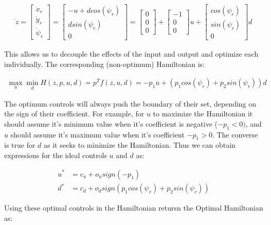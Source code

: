 \documentclass[a4paper]{article}
\begin{document}
\begin{align*}
  \dot{z}
  =
  \left[\begin{matrix} \dot{x}_r \\ \dot{y}_r \\ \dot{\psi}_r \end{matrix}\right]
  =
  \left[\begin{matrix} -u + d cos(\psi_r) \\ d sin(\psi_r) \\ 0 \end{matrix}\right]
  =
  \left[ \begin{matrix} 0 \\ 0 \\ 0 \end{matrix}\right] + \left[ \begin{matrix}-1 \\ 0 \\ 0\end{matrix}\right] u +\left[\begin{matrix} cos(\psi_r) \\ sin(\psi_r) \\ 0 \end{matrix}\right] d
\end{align*}

This allows us to decouple the effects of the input and output and optimize each individually.
   The corresponding (non-optimum) Hamiltonian is:

\begin{align*}
  \underset{u}{\max} \underset{d}{\min} H(z,p,u,d) =  p^T f(z,u,d) = -p_1 u + (p_1 cos(\psi_r) + p_2 sin(\psi_r)) d
\end{align*}

The optimum controls will always push the boundary of their set, depending on the sign of their coefficient.
For example, for $u$ to maximize the Hamiltonian it should assume it's minimum value when it's coefficient is negative ($-p_1 < 0)$, and $u$ should assume it's maximum value when it's coefficient $-p_1 > 0$.
The converse is true for $d$ as it seeks to minimize the Hamiltonian.
Thus we can obtain expressions for the ideal controls $u$ and $d$ as:

\begin{align*}
  u^* &= c_u + o_u sign(-p_1) \\
  d^* &= c_d + o_d sign(p_1 cos(\psi_r) + p_2 sin(\psi_r))
\end{align*}

Using these optimal controls in the Hamiltonian retursn the Optimal Hamiltonian as:
\end{document}
